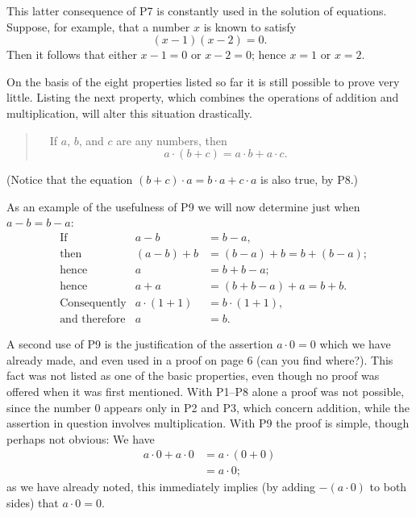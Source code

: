 This latter consequence of P7 is constantly used in the solution of
equations. Suppose, for example, that a number $x$ is known to satisfy
\[ (x-1)(x-2) = 0. \]
Then it follows that either $x-1=0$ or $x-2=0$; hence $x=1$ or $x=2$.

On the basis of the eight properties listed so far it is still possible to
prove very little. Listing the next property, which combines the operations
of addition and multiplication, will alter this situation drastically.

\begin{quote}
\ \ If $a$, $b$, and $c$ are any numbers, then
\[ a \cdot (b + c) = a \cdot b + a \cdot c. \]
\end{quote}

(Notice that the equation $(b+c) \cdot a = b \cdot a + c \cdot a$ is also
true, by P8.)

As an example of the usefulness of P9 we will now determine just when
$a-b = b-a$:
\begin{align*}
&\text{If} & a - b &= b - a,\\
&\text{then} & (a-b)+b &= (b-a)+b = b+(b-a);\\
&\text{hence} & a &= b + b - a;\\
&\text{hence} & a + a &= (b+b-a)+a = b+b.\\
&\text{Consequently} & a \cdot (1+1) &= b \cdot (1+1),\\
&\text{and therefore} & a &= b.
\end{align*}

A second use of P9 is the justification of the assertion $a \cdot 0 = 0$
which we have already made, and even used in a proof on page 6 (can you find
where?). This fact was not listed as one of the basic properties, even though
no proof was offered when it was first mentioned. With P1--P8 alone a proof
was not possible, since the number $0$ appears only in P2 and P3, which
concern addition, while the assertion in question involves multiplication.
With P9 the proof is simple, though perhaps not obvious: We have
\begin{align*}
a \cdot 0 + a \cdot 0 &= a \cdot (0 + 0)\\
&= a \cdot 0;
\end{align*}
as we have already noted, this immediately implies (by adding $-(a \cdot 0)$
to both sides) that $a \cdot 0 = 0$.


